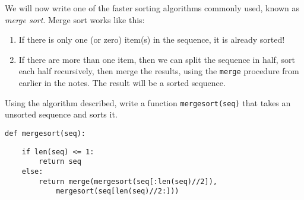 \question We will now write one of the faster sorting algorithms
commonly used, known as {\it merge sort}. Merge sort works like this:
\begin{enumerate}
    \item If there is only one (or zero) item(s) in the sequence,
        it is already sorted!
    \item If there are more than one item, then we can split the
        sequence in half, sort each half recursively, then merge
        the results, using the {\tt merge} procedure from earlier
        in the notes. The result will be a sorted sequence.
\end{enumerate}
Using the algorithm described, write a function {\tt mergesort(seq)}
that takes an unsorted sequence and sorts it.
\begin{lstlisting}
def mergesort(seq):
\end{lstlisting}
\begin{solution}[1.7in]
\begin{lstlisting}
    if len(seq) <= 1:
        return seq
    else:
        return merge(mergesort(seq[:len(seq)//2]),
            mergesort(seq[len(seq)//2:]))
\end{lstlisting}
\end{solution}
